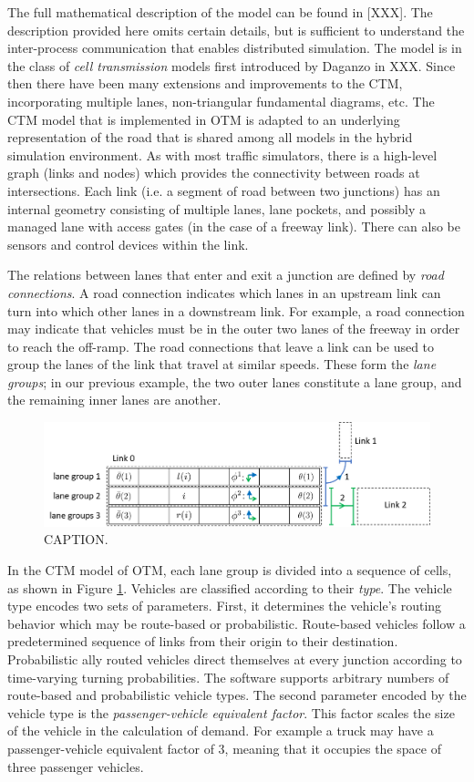 The full mathematical description of the model can be found in [XXX]. The description provided here omits certain details, but is sufficient to understand the inter-process communication that enables distributed simulation. The model is in the class of \textit{cell transmission} models first introduced by Daganzo in XXX. Since then there have been many extensions and improvements to the CTM, incorporating multiple lanes, non-triangular fundamental diagrams, etc. The CTM model that is implemented in OTM is adapted to an underlying representation of the road that is shared among 
all models in the hybrid simulation environment. As with most traffic simulators, there is a high-level graph (links and nodes) which provides the connectivity between roads at intersections. Each link (i.e. a segment of road between two junctions) has an internal geometry consisting of multiple lanes, lane pockets, and possibly a managed lane with access gates (in the case of a freeway link). There can also be sensors and control devices within the link. 

The relations between lanes that enter and exit a junction are defined by \textit{road connections}. A road connection indicates which lanes in an upstream link can turn into which other lanes in a downstream link. For example, a road connection may indicate that vehicles must be in the outer two lanes of the freeway in order to reach the off-ramp. The road connections that leave a link can be used to group the lanes of the link that travel at similar speeds. These form the \textit{lane groups}; in our previous example, the two outer lanes constitute a lane group, and the remaining inner lanes are another. 

\begin{figure}[h!]
    \centering
    \includegraphics[width=\columnwidth]{figs/cells.png}
    \caption{CAPTION.}
    \label{fig:cells}
\end{figure}

In the CTM model of OTM, each lane group is divided into a sequence of cells, as shown in Figure \ref{fig:cells}. Vehicles are classified according to their \textit{type}. The vehicle type encodes two sets of parameters. First, it determines the vehicle's routing behavior which may be route-based or probabilistic. Route-based vehicles follow a predetermined sequence of links from their origin to their destination. Probabilistic ally routed vehicles direct themselves at every junction according to time-varying turning probabilities. The software supports arbitrary numbers of route-based and probabilistic vehicle types. The second parameter encoded by the vehicle type is the \textit{passenger-vehicle equivalent factor}. This factor scales the size of the vehicle in the calculation of demand. For example a truck may have a passenger-vehicle equivalent factor of 3, meaning that it occupies the space of three passenger vehicles.

